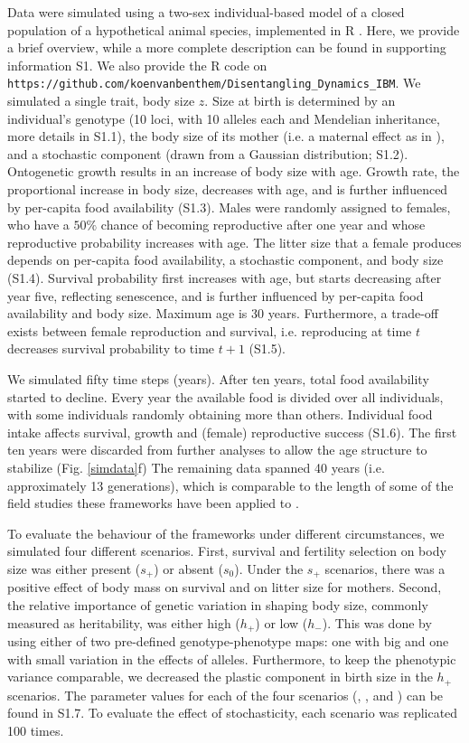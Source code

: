 Data were simulated using a two-sex individual-based model of a closed population of a hypothetical animal species, implemented in R \parencite{R2014}. Here, we provide a brief overview, while a more complete description can be found in supporting information S1. We also provide the R code on \newline \verb|https://github.com/koenvanbenthem/Disentangling_Dynamics_IBM|. We simulated a single trait, body size $z$. Size at birth is determined by an individual's genotype (10 loci, with 10 alleles each and Mendelian inheritance, more details in S1.1), the body size of its mother (i.e. a maternal effect as in \cite{Falconer1965}), and a stochastic component (drawn from a Gaussian distribution; S1.2). Ontogenetic growth results in an increase of body size with age. Growth rate, the proportional increase in body size,  decreases with age, and is further influenced by per-capita food availability (S1.3). Males were randomly assigned to females, who have a $50\%$ chance of becoming reproductive after one year and whose reproductive probability increases with age. The litter size that a female produces depends on per-capita food availability, a stochastic component, and body size (S1.4). Survival probability first increases with age, but starts decreasing after year five, reflecting senescence, and is further influenced by per-capita food availability and body size. Maximum age is 30 years. Furthermore, a trade-off exists between female reproduction and survival, i.e. reproducing at time $t$ decreases survival probability to time $t+1$ (S1.5). 

We simulated fifty time steps (years). After ten years, total food availability started to decline. Every year the available food is divided over all individuals, with some individuals randomly obtaining more than others. Individual food intake affects survival, growth and (female) reproductive success (S1.6). The first ten years were discarded from further analyses to allow the age structure to stabilize (Fig. \ref{simdata}f) The remaining data spanned 40 years (i.e. approximately 13 generations), which is comparable to the length of some of the field studies these frameworks have been applied to \parencite{Clutton-brock2010}. 

To evaluate the behaviour of the frameworks under different circumstances, we simulated four different scenarios. First, survival and fertility selection on body size was either present ($s_+$) or absent ($s_0$). Under the $s_+$ scenarios, there was a positive effect of body mass on survival and on litter size for mothers. Second, the relative importance of genetic variation in shaping body size, commonly measured as heritability, was either high ($h_+$) or low ($h_-$). This was done by using either of two pre-defined genotype-phenotype maps: one with big and one with small variation in the effects of alleles. Furthermore, to keep the phenotypic variance comparable, we decreased the plastic component in birth size in the $h_+$ scenarios. The parameter values for each of the four scenarios (\sh, \sH, \Sh and \SH) can be found in S1.7. To evaluate the effect of stochasticity, each scenario was replicated 100 times.

